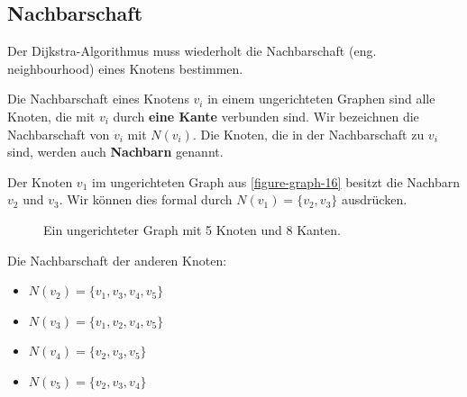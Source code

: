 \subsection{Nachbarschaft}

Der Dijkstra-Algorithmus muss wiederholt die Nachbarschaft (eng. neighbourhood) eines Knotens bestimmen.

\begin{definition}[Nachbarschaft]
Die Nachbarschaft eines Knotens $v_i$ in einem ungerichteten Graphen sind alle Knoten, die mit $v_i$ durch \textbf{eine Kante} verbunden sind. Wir bezeichnen die Nachbarschaft von $v_i$ mit $N(v_i)$. Die Knoten, die in der Nachbarschaft zu $v_i$ sind, werden auch \textbf{Nachbarn} genannt.
\end{definition}

\begin{example}
Der Knoten $v_1$ im ungerichteten Graph aus \autoref{figure-graph-16} besitzt die Nachbarn $v_2$ und $v_3$. Wir können dies formal durch $N(v_1) = \{v_2, v_3 \}$ ausdrücken.

\begin{figure}[htb]
\centering
{}
\caption{Ein ungerichteter Graph mit 5 Knoten und 8 Kanten.}
\label{figure-graph-16}
\end{figure}

Die Nachbarschaft der anderen Knoten:

\begin{multicols}{2}
\begin{itemize}
	\item $N(v_2) = \{v_1, v_3, v_4, v_5 \}$
	\item $N(v_3) = \{v_1, v_2, v_4, v_5 \}$
	\item $N(v_4) = \{v_2, v_3, v_5 \}$
	\item $N(v_5) = \{v_2, v_3, v_4 \}$
\end{itemize}
\end{multicols}

\end{example}

